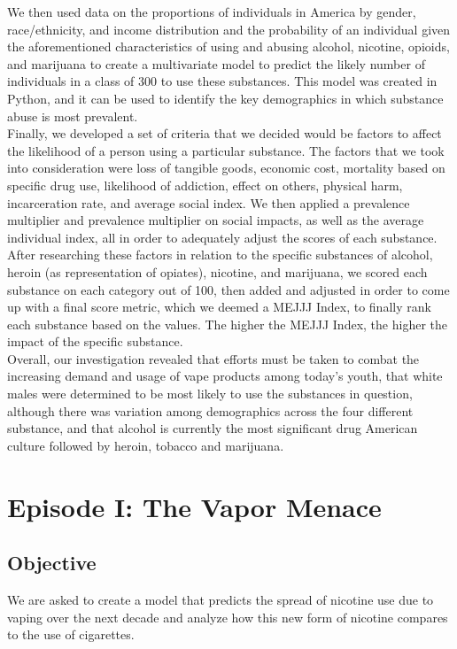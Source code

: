 \documentclass{article}
\begin{document}
We then used data on the proportions of individuals in America by gender, race/ethnicity, and income distribution and the probability of an individual given the aforementioned characteristics of using and abusing alcohol, nicotine, opioids, and marijuana to create a multivariate model to predict the likely number of individuals in a class of 300 to use these substances. This model was created in Python, and it can be used to identify the key demographics in which substance abuse is most prevalent.\\

Finally, we developed a set of criteria that we decided would be factors to affect the likelihood of a person using a particular substance. The factors that we took into consideration were loss of tangible goods, economic cost, mortality based on specific drug use, likelihood of addiction, effect on others, physical harm, incarceration rate, and average social index. We then applied a prevalence multiplier and prevalence multiplier on social impacts, as well as the average individual index, all in order to adequately adjust the scores of each substance. After researching these factors in relation to the specific substances of alcohol, heroin (as representation of opiates), nicotine, and marijuana, we scored each substance on each category out of 100, then added and adjusted in order to come up with a final score metric, which we deemed a MEJJJ Index, to finally rank each substance based on the values. The higher the MEJJJ Index, the higher the impact of the specific substance. \\

Overall, our investigation revealed that efforts must be taken to combat the increasing demand and usage of vape products among today’s youth, that white males were determined to be most likely to use the substances in question, although there was variation among demographics across the four different substance, and that alcohol is currently the most significant drug American culture followed by heroin, tobacco and marijuana.

\newpage
\tableofcontents
\newpage

\section{Episode I: The Vapor Menace}
\subsection{Objective}
We are asked to create a model that predicts the spread of nicotine use due to vaping over the next decade and analyze how this new form of nicotine compares to the use of cigarettes.
\end{document}
